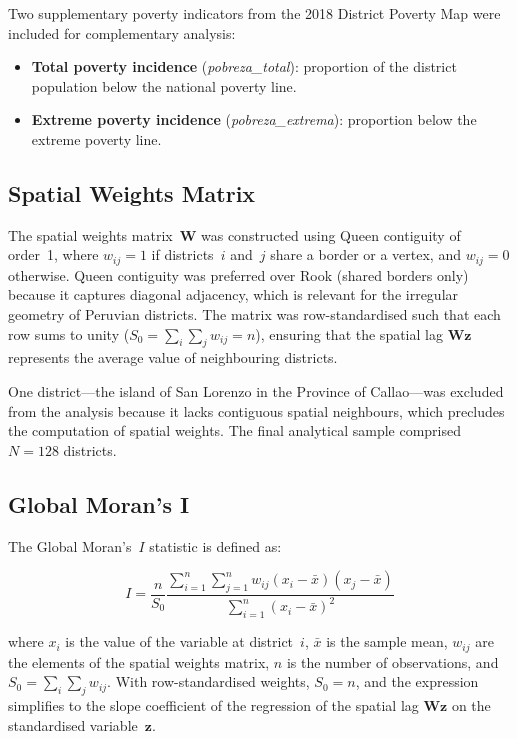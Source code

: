\documentclass[12pt,a4paper,twoside]{article}
\begin{document}
Two supplementary poverty indicators from the 2018 District Poverty Map were
included for complementary analysis:

\begin{itemize}
  \item \textbf{Total poverty incidence} (\textit{pobreza\_total}): proportion of
        the district population below the national poverty line.
  \item \textbf{Extreme poverty incidence} (\textit{pobreza\_extrema}): proportion
        below the extreme poverty line.
\end{itemize}

\subsection{Spatial Weights Matrix}

The spatial weights matrix~$\mathbf{W}$ was constructed using Queen contiguity
of order~1, where $w_{ij} = 1$ if districts~$i$ and~$j$ share a border or a
vertex, and $w_{ij} = 0$ otherwise. Queen contiguity was preferred over Rook
(shared borders only) because it captures diagonal adjacency, which is relevant
for the irregular geometry of Peruvian districts. The matrix was row-standardised
such that each row sums to unity ($S_0 = \sum_i \sum_j w_{ij} = n$), ensuring
that the spatial lag $\mathbf{Wz}$ represents the average value of neighbouring
districts.

One district---the island of San Lorenzo in the Province of Callao---was excluded
from the analysis because it lacks contiguous spatial neighbours, which precludes
the computation of spatial weights. The final analytical sample comprised
$N = 128$ districts.

\subsection{Global Moran's I}

The Global Moran's~$I$ statistic is defined as:

\begin{equation}\label{eq:moran}
  I = \frac{n}{S_0}
      \frac{\sum_{i=1}^{n} \sum_{j=1}^{n} w_{ij} (x_i - \bar{x})(x_j - \bar{x})}
           {\sum_{i=1}^{n} (x_i - \bar{x})^2}
\end{equation}

where $x_i$ is the value of the variable at district~$i$, $\bar{x}$ is the sample
mean, $w_{ij}$ are the elements of the spatial weights matrix, $n$ is the number
of observations, and $S_0 = \sum_i \sum_j w_{ij}$. With row-standardised weights,
$S_0 = n$, and the expression simplifies to the slope coefficient of the
regression of the spatial lag $\mathbf{Wz}$ on the standardised variable~$\mathbf{z}$.
\end{document}
